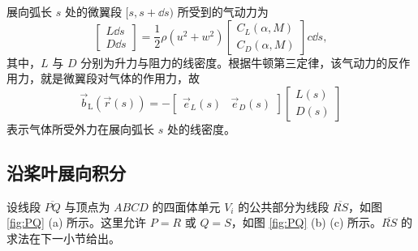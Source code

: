展向弧长 $s$ 处的微翼段 $[s,s+\dd{s})$ 所受到的气动力为
\begin{equation}
\begin{bmatrix}L\dd{s}\\
D\dd{s}
\end{bmatrix}=\frac{1}{2}\rho(u^{2}+w^{2})\begin{bmatrix}C_{L}(\alpha,M)\\
C_{D}(\alpha,M)
\end{bmatrix}c\dd{s},
\end{equation}
其中，$L$ 与 $D$ 分别为升力与阻力的线密度。根据牛顿第三定律，该气动力的反作用力，就是微翼段对气体的作用力，故
\begin{equation}
\vec{b}_{\mathrm{L}}(\vec{r}(s))=-\begin{bmatrix}\vec{e}_{L}(s) & \vec{e}_{D}(s)\end{bmatrix}\begin{bmatrix}L(s)\\
D(s)
\end{bmatrix}
\end{equation}
表示气体所受外力在展向弧长 $s$ 处的线密度。

\subsection{沿桨叶展向积分}

设线段
$\overline{PQ}$ 与顶点为 $ABCD$ 的四面体单元 $V_{i}$ 的公共部分为线段 $\overline{RS}$，如图
\ref{fig:PQ} (a) 所示。这里允许 $P=R$ 或 $Q=S$，如图 \ref{fig:PQ} (b) (c)
所示。$\overline{RS}$ 的求法在下一小节给出。

